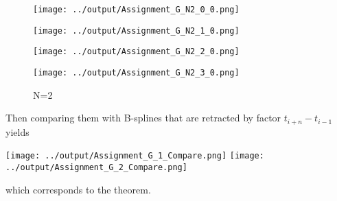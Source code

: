 \documentclass{article}
\begin{document}
  \begin{figure}[!htbp]
    \flushleft
    \subfigure
    {
    \begin{minipage}[b]{.23\linewidth}
      \flushleft
    \texttt{[image: ../output/Assignment\_G\_N2\_0\_0.png]}
    \end{minipage}
    }
    \subfigure
    {
    \begin{minipage}[b]{.23\linewidth}
      \flushleft
    \texttt{[image: ../output/Assignment\_G\_N2\_1\_0.png]}
    \end{minipage}
    }
    \subfigure
    {
    \begin{minipage}[b]{.23\linewidth}
      \flushleft
    \texttt{[image: ../output/Assignment\_G\_N2\_2\_0.png]}
    \end{minipage}
    }
    \subfigure
    {
    \begin{minipage}[b]{.23\linewidth}
      \flushleft
    \texttt{[image: ../output/Assignment\_G\_N2\_3\_0.png]}
    \end{minipage}
    }
    \newline
    \newline
    \newline
    \caption{N=2}
    \end{figure}
\newpage

    Then comparing them with B-splines that are retracted by factor $t_{i+n}-t_{i-1}$ 
    yields

\texttt{[image: ../output/Assignment\_G\_1\_Compare.png]}
\texttt{[image: ../output/Assignment\_G\_2\_Compare.png]}

which corresponds to the theorem.
\end{document}
